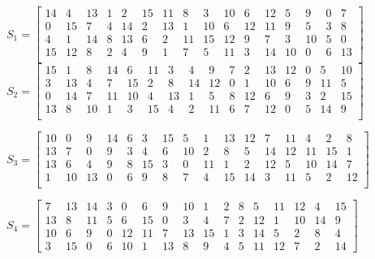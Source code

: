 \documentclass[11pt]{article}
\begin{document}
\begin{center}
    $ S_1 = 
    \begin{bmatrix}
        14 & 4 & 13 & 1 & 2 & 15 & 11 & 8 & 3 & 10 & 6 & 12 & 5 & 9 & 0 & 7\\
        0 & 15 & 7 & 4 & 14 & 2 & 13 & 1 & 10 & 6 & 12 & 11 & 9 & 5 & 3 & 8\\
        4 & 1 & 14 & 8 & 13 & 6 & 2 & 11 & 15 & 12 & 9 & 7 & 3 & 10 & 5 & 0\\  15 & 12 & 8 & 2 & 4 & 9 & 1 & 7 & 5 & 11 & 3 & 14 & 10 & 0 & 6 & 13\\

    \end{bmatrix}$\\
    
    $ S_2 = 
    \begin{bmatrix}
        15 & 1 & 8 & 14 & 6 & 11 & 3 & 4 & 9 & 7 & 2 & 13 & 12 & 0 & 5 & 10 \\
        3 & 13 & 4 & 7 & 15 & 2 & 8 & 14 & 12 & 0 & 1 & 10 & 6 & 9 & 11 & 5\\
        0 & 14 & 7 & 11 & 10 & 4 & 13 & 1 & 5 & 8 & 12 & 6 & 9 & 3 & 2 & 15 \\
        13 & 8 & 10 & 1 & 3 & 15 & 4 & 2 & 11 & 6 & 7 & 12 & 0 & 5 & 14 & 9\\
    \end{bmatrix}$\\
    \vspace{3mm}
    
    $ S_3 = 
    \begin{bmatrix}
        10 & 0 & 9 & 14 & 6 & 3 & 15 & 5 & 1 & 13 & 12 & 7 & 11 & 4 & 2 & 8 \\
        13 & 7 & 0 & 9 & 3 & 4 & 6 & 10 & 2 & 8 & 5 & 14 & 12 & 11 & 15 & 1 \\
        13 & 6 & 4 & 9 & 8 & 15 & 3 & 0 & 11 & 1 & 2 & 12 & 5 & 10 & 14 & 7 \\
        1 & 10 & 13 & 0 & 6 & 9 & 8 & 7 & 4 & 15 & 14 & 3 & 11 & 5 & 2 & 12 \\
    \end{bmatrix}$\\
    \vspace{3mm}
    
    $ S_4 = 
    \begin{bmatrix}
        7 & 13 & 14 & 3 & 0 & 6 & 9 & 10 & 1 & 2 & 8 & 5 & 11 & 12 & 4 & 15 \\
        13 & 8 & 11 & 5 & 6 & 15 & 0 & 3 & 4 & 7 & 2 & 12 & 1 & 10 & 14 & 9 \\
        10 & 6 & 9 & 0 & 12 & 11 & 7 & 13 & 15 & 1 & 3 & 14 & 5 & 2 & 8 & 4 \\
        3 & 15 & 0 & 6 & 10 & 1 & 13 & 8 & 9 & 4 & 5 & 11 & 12 & 7 & 2 & 14 
    \end{bmatrix}$\\
    \vspace{3mm}


\end{center}
\end{document}
